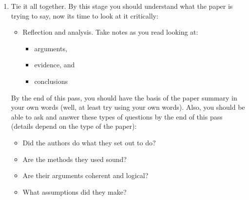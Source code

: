 \documentclass[a4paper]{article}
\begin{document}
\begin{enumerate}
  \item Tie it all together. By this stage you should understand what the paper is trying to say, now its time to look at it critically:
  \renewcommand{\labelitemi}{$\square$}
  	\begin{itemize}
		\item Reflection and analysis. Take notes as you read looking at:
			\begin{itemize}
			\item arguments,
			\item evidence, and
			\item conclusions
			\end{itemize}
	\end{itemize}
   By the end of this pass, you should have the basis of the paper summary in your own words (well, at least try using your own words). Also, you should be able to ask and answer these types of questions by the end of this pass (details depend on the type of the paper):
   \renewcommand{\labelitemi}{\textbullet}
   \begin{itemize}
   \item Did the authors do what they set out to do?
   \item Are the methods they used sound?
   \item Are their arguments coherent and logical?
   \item What assumptions did they make?
   \end{itemize}

\end{enumerate}
\end{document}
